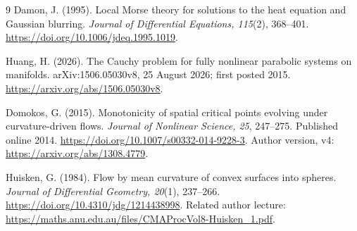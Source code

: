 \documentclass[11pt,a4paper]{article}
\theoremstyle{remark}\newtheorem{remark}[theorem]{Remark}
\begin{document}
\begin{thebibliography}{9}
Damon, J. (1995). Local Morse theory for solutions to the heat equation and Gaussian blurring. \emph{Journal of Differential Equations, 115}(2), 368--401. \url{https://doi.org/10.1006/jdeq.1995.1019}.

Huang, H. (2026). The Cauchy problem for fully nonlinear parabolic systems on manifolds. arXiv:1506.05030v8, 25 August 2026; first posted 2015. \url{https://arxiv.org/abs/1506.05030v8}.

Domokos, G. (2015). Monotonicity of spatial critical points evolving under curvature-driven flows. \emph{Journal of Nonlinear Science, 25}, 247--275. Published online 2014. \url{https://doi.org/10.1007/s00332-014-9228-3}. Author version, v4: \url{https://arxiv.org/abs/1308.4779}.

Huisken, G. (1984). Flow by mean curvature of convex surfaces into spheres. \emph{Journal of Differential Geometry, 20}(1), 237--266. \url{https://doi.org/10.4310/jdg/1214438998}. Related author lecture: \url{https://maths.anu.edu.au/files/CMAProcVol8-Huisken_1.pdf}.
\end{thebibliography}
\end{document}
